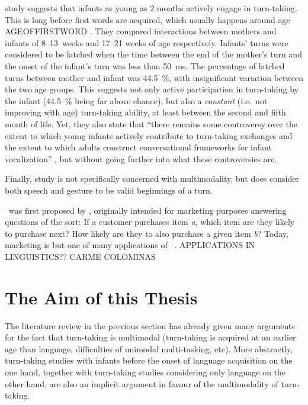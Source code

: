  study suggests that infants as young as 2 months actively engage in turn-taking. This is long before first words are acquired, which usually happens around age AGEOFFIRSTWORD \citep{nosource}.  They compared interactions between mothers and infants of 8--13~weeks and 17--21 weeks of age respectively. Infants' turns were considered to be latched when the time between the end of the mother's turn and the onset of the infant's turn was less than 50~ms. The percentage of latched turns between mother and infant was 44.5~\%, with insignificant variation between the two age groups. This suggests not only active participation in turn-taking by the infant (44.5~\% being far above chance), but also a \emph{constant} (i.e.\ not improving with age) turn-taking ability, at least between the second and fifth month of life.
Yet, they also state that ``there remains some controversy over the extent to which young infants actively contribute to turn-taking exchanges and the extent to which adults construct conversational frameworks for infant vocalization'' \citep[]{gratier15}, but without going further into what these controversies are.

Finally,  study is not specifically concerned with multimodality, but does consider both speech and gesture to be valid beginnings of a turn.



\fpmsentence\ was first proposed by \citet{agrawal93}, originally intended for marketing purposes answering questions of the sort: If a customer purchases item \emph{a}, which item are they likely to purchase next? How likely are they to also purchase a given item \emph{b}? Today, marketing is but one of many applications of \fpmlower\ \citep[]{han07}. APPLICATIONS IN LINGUISTICS?? CARME COLOMINAS


\section{The Aim of this Thesis}
\label{sec:introductionaim}
The literature review in the previous section has already given many arguments for the fact that turn-taking is multimodal (turn-taking is acquired at an earlier age than language, difficulties of unimodal multi-tasking, etc). %
More abstractly, turn-taking studies with infants before the onset of language acquisition on the one hand, together with turn-taking studies considering only language on the other hand, are also an implicit argument in favour of the multimodality of turn-taking. %

